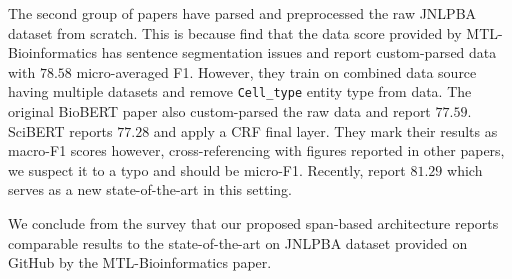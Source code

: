 The second group of papers have parsed and preprocessed the raw JNLPBA dataset from scratch. This is because \cite{yoon2019collabonet} find that the data score provided by MTL-Bioinformatics has sentence segmentation issues and report custom-parsed data with $78.58$ micro-averaged F1. However, they train on combined data source having multiple datasets and remove \texttt{Cell\_type} entity type from data. The original BioBERT paper\cite{lee2020biobert} also custom-parsed the raw data and report $77.59$. SciBERT\cite{beltagy2019scibert} reports $77.28$ and apply a CRF final layer. They mark their results as macro-F1 scores however, cross-referencing with figures reported in other papers, we suspect it to a typo and should be micro-F1. Recently, \cite{kocaman2021spark} report $81.29$ which serves as a new state-of-the-art in this setting.

We conclude from the survey that our proposed span-based architecture reports comparable results to the state-of-the-art on JNLPBA dataset provided on GitHub by the MTL-Bioinformatics\cite{crichton2017neural} paper.

